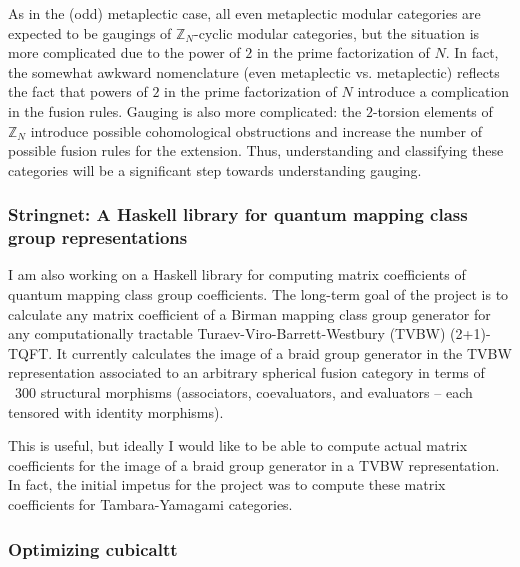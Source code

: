 \documentclass[12pt]{article}
\newcommand{\ZZ}{\mathbb{Z}}
\theoremstyle{plain} \numberwithin{equation}{section}
\theoremstyle{definition}
\begin{document}
As in the (odd) metaplectic case, all even metaplectic modular categories are expected to be gaugings of $\ZZ_{N}$-cyclic modular categories, but the situation is more complicated due to the power of $2$ in the prime factorization of $N$. In fact, the somewhat awkward nomenclature (even metaplectic vs. metaplectic) reflects the fact that powers of $2$ in the prime factorization of $N$ introduce a complication in the fusion rules.   Gauging is also more complicated: the $2$-torsion elements of $\ZZ_N$ introduce possible cohomological obstructions and increase the number of possible fusion rules for the extension.  Thus, understanding and classifying these categories will be a significant step towards understanding gauging.

\subsubsection{Stringnet: A Haskell library for quantum mapping class group representations}
I am also working on a Haskell library for computing matrix coefficients of quantum mapping class group coefficients.  The long-term goal of the project is to calculate any matrix coefficient of a Birman mapping class group generator for any computationally tractable Turaev-Viro-Barrett-Westbury (TVBW) (2+1)-TQFT.   It currently calculates the image of a braid group generator in the TVBW representation associated to an arbitrary spherical fusion category in terms of ~300 structural morphisms (associators, coevaluators, and evaluators -- each tensored with identity morphisms).

This is useful, but ideally I would like to be able to compute actual matrix coefficients for the image of a braid group generator in a TVBW representation.  In fact, the initial impetus for the project was to compute these matrix coefficients for Tambara-Yamagami categories.  

\subsubsection{Optimizing cubicaltt}
\end{document}
